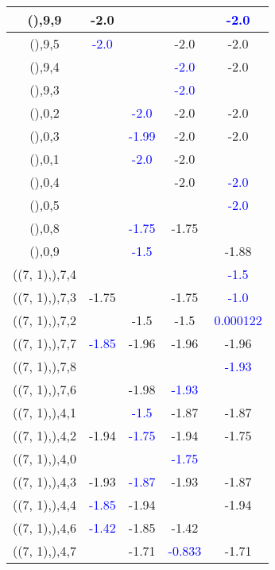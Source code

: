 \documentclass{article}
\begin{document}
\begin{center}
\begin{longtable}{|c|c|c|c|c|}
        	\hline
        	(),9,9&-2.0&&& \textcolor{blue}{-2.0}\\
        	\hline
        	(),9,5& \textcolor{blue}{-2.0}&&-2.0&-2.0\\
        	\hline
        	(),9,4&&& \textcolor{blue}{-2.0}&-2.0\\
        	\hline
        	(),9,3&&& \textcolor{blue}{-2.0}&\\
        	\hline
        	(),0,2&& \textcolor{blue}{-2.0}&-2.0&-2.0\\
        	\hline
        	(),0,3&& \textcolor{blue}{-1.99}&-2.0&-2.0\\
        	\hline
        	(),0,1&& \textcolor{blue}{-2.0}&-2.0&\\
        	\hline
        	(),0,4&&&-2.0& \textcolor{blue}{-2.0}\\
        	\hline
        	(),0,5&&&& \textcolor{blue}{-2.0}\\
        	\hline
        	(),0,8&& \textcolor{blue}{-1.75}&-1.75&\\
        	\hline
        	(),0,9&& \textcolor{blue}{-1.5}&&-1.88\\
        	\hline
        	((7, 1),),7,4&&&& \textcolor{blue}{-1.5}\\
        	\hline
        	((7, 1),),7,3&-1.75&&-1.75& \textcolor{blue}{-1.0}\\
        	\hline
        	((7, 1),),7,2&&-1.5&-1.5& \textcolor{blue}{0.000122}\\
        	\hline
        	((7, 1),),7,7& \textcolor{blue}{-1.85}&-1.96&-1.96&-1.96\\
        	\hline
        	((7, 1),),7,8&&&& \textcolor{blue}{-1.93}\\
        	\hline
        	((7, 1),),7,6&&-1.98& \textcolor{blue}{-1.93}&\\
        	\hline
        	((7, 1),),4,1&& \textcolor{blue}{-1.5}&-1.87&-1.87\\
        	\hline
        	((7, 1),),4,2&-1.94& \textcolor{blue}{-1.75}&-1.94&-1.75\\
        	\hline
        	((7, 1),),4,0&&& \textcolor{blue}{-1.75}&\\
        	\hline
        	((7, 1),),4,3&-1.93& \textcolor{blue}{-1.87}&-1.93&-1.87\\
        	\hline
        	((7, 1),),4,4& \textcolor{blue}{-1.85}&-1.94&&-1.94\\
        	\hline
        	((7, 1),),4,6& \textcolor{blue}{-1.42}&-1.85&-1.42&\\
        	\hline
        	((7, 1),),4,7&&-1.71& \textcolor{blue}{-0.833}&-1.71\\

\end{longtable}
\end{center}
\end{document}
